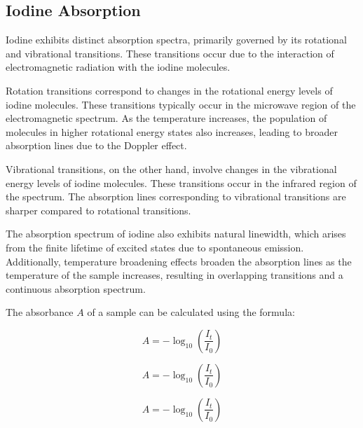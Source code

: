 \subsection{Iodine Absorption}

    Iodine exhibits distinct absorption spectra, primarily governed by its rotational and vibrational transitions. These transitions occur due to the interaction of electromagnetic radiation with the iodine molecules.

    Rotation transitions correspond to changes in the rotational energy levels of iodine molecules. These transitions typically occur in the microwave region of the electromagnetic spectrum. As the temperature increases, the population of molecules in higher rotational energy states also increases, leading to broader absorption lines due to the Doppler effect.
    
    Vibrational transitions, on the other hand, involve changes in the vibrational energy levels of iodine molecules. These transitions occur in the infrared region of the spectrum. The absorption lines corresponding to vibrational transitions are sharper compared to rotational transitions.
    
    The absorption spectrum of iodine also exhibits natural linewidth, which arises from the finite lifetime of excited states due to spontaneous emission. Additionally, temperature broadening effects broaden the absorption lines as the temperature of the sample increases, resulting in overlapping transitions and a continuous absorption spectrum.
    
    The absorbance $A$ of a sample can be calculated using the formula:
    
\begin{equation}
    \label{eq:fundamentals:absorbance}
    A = -\log_{10}\left(\frac{I_t}{I_0}\right)
\end{equation}

\begin{equation}
    \label{eq:fundamentals:absorptivity}
    A = -\log_{10}\left(\frac{I_t}{I_0}\right)
\end{equation}

\begin{equation}
    \label{eq:fundamentals:beer}
    A = -\log_{10}\left(\frac{I_t}{I_0}\right)
\end{equation}
    

